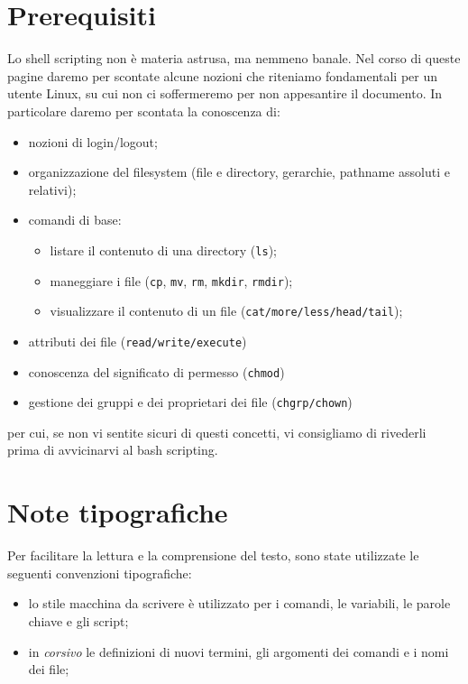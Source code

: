 \section{Prerequisiti}
Lo shell scripting non \`e materia astrusa, ma nemmeno banale. Nel corso di
queste pagine daremo per scontate alcune nozioni che riteniamo fondamentali
per un utente Linux, su cui non ci soffermeremo per non appesantire il
documento.
In particolare daremo per scontata la conoscenza di:
\begin{itemize}
	\item nozioni di login/logout;
	\item organizzazione del filesystem (file e directory, gerarchie,
	pathname assoluti e relativi);
	\item comandi di base:
	\begin{itemize}
		\item listare il contenuto di una directory (\texttt{ls});
		\item maneggiare i file (\texttt{cp}, \texttt{mv}, \texttt{rm}, 
			\texttt{mkdir}, \texttt{rmdir});
		\item visualizzare il contenuto di un file
		(\texttt{cat/more/less/head/tail});
	\end{itemize}
	\item attributi dei file (\texttt{read/write/execute})
	\item conoscenza del significato di permesso (\texttt{chmod})
	\item gestione dei gruppi e dei proprietari dei file (\texttt{chgrp/chown})
\end{itemize}
per cui, se non vi sentite sicuri di questi concetti, vi consigliamo di
rivederli prima di avvicinarvi al bash scripting.

\section{Note tipografiche}
Per facilitare la lettura e la comprensione del testo, sono state utilizzate
le seguenti convenzioni tipografiche:
\begin{itemize}
	\item lo stile {\ttfamily macchina da scrivere} \`e utilizzato per i
		comandi, le variabili, le parole chiave e gli script;
	\item in {\itshape corsivo} le definizioni di nuovi termini,
		gli argomenti dei comandi e i nomi dei file;
\end{itemize}

